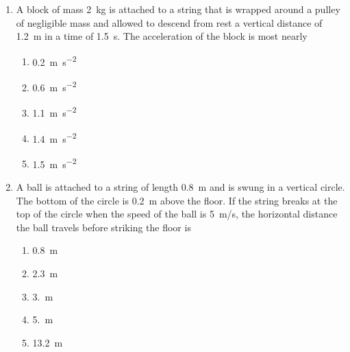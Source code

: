 \documentclass{../../oss-apphys}
\begin{document}
\begin{multicols}{2}
\begin{enumerate}[leftmargin=18pt]
  \item A block of mass \SI{2}{\kilo\gram} is attached to a string that is
    wrapped around a pulley of negligible mass and allowed to descend from rest
    a vertical distance of \SI{1.2}{\metre} in a time of \SI{1.5}{\second}. The
    acceleration of the block is most nearly
    \begin{center}
      \vspace{-.2in}
    \end{center}
    \begin{enumerate}[noitemsep,topsep=0pt,leftmargin=18pt,label=(\Alph*)]
    \item\SI{0.2}{\metre\per\second^2}
    \item\SI{.6}{\metre\per\second^2}
    \item\SI{1.1}{\metre\per\second^2}
    \item\SI{1.4}{\metre\per\second^2}
    \item\SI{1.5}{\metre\per\second^2}
    \end{enumerate}

    
  \item A ball is attached to a string of length \SI{.8}{\metre} and is swung
    in a vertical circle. The bottom of the circle is \SI{.2}{\metre} above the
    floor. If the string breaks at the top of the circle when the speed of the
    ball is \SI{5}{m/s}, the horizontal distance the ball travels before
    striking the floor is
    \begin{center}
      \vspace{-.2in}
    \end{center}
    \begin{enumerate}[noitemsep,topsep=0pt,leftmargin=18pt,label=(\Alph*)]
    \item\SI{.8}{\metre}
    \item\SI{2.3}{\metre}
    \item\SI{3.}{\metre}
    \item\SI{5.}{\metre}
    \item\SI{13.2}{\metre}
    \end{enumerate}
    \columnbreak
    

\end{enumerate}
\end{multicols}
\end{document}
